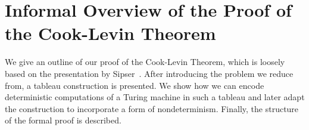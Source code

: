 \newcommand*{\gennp}{\normalfont\textbf{TMGenNP}}

\newcommand{\strent}{\rightsquigarrow}
\newcommand{\Rfinal}{R_{\text{final}}}


\newcommand{\BPR}{\normalfont\textbf{BinaryPR}}
\newcommand{\fsat}{\normalfont\textbf{FSAT}}
\newcommand{\sat}{\normalfont\textbf{SAT}}

\newcommand{\trewwin}[6]{%
  \tikzexternaldisable{}
  \begin{tikzpicture}[baseline={([yshift=-22pt]current bounding box.north)}]
    \draw[thick] (0, 0) -- (2.25, 0);
    \draw (0.75, -0.75) -- (0.75, 0.75);
    \draw (1.5, -0.75) -- (1.5, 0.75);
    \node at (0.375, 0.375) {\ensuremath{#1}};
    \node at (0.375, -0.375) {\ensuremath{#4}};
    \node at (1.125, 0.375) {\ensuremath{#2}};
    \node at (1.125, -0.375) {\ensuremath{#5}};
    \node at (1.875, 0.375) {\ensuremath{#3}};
    \node at (1.875, -0.375) {\ensuremath{#6}};
  \end{tikzpicture}
  \tikzexternalenable{}
}

\newcommand*{\irewwin}[6]{\ensuremath{[#1, #2, #3]~/~[#4, #5, #6]}}

\newcommand{\blank}{\textbf{\normalfont\textvisiblespace}}
\newcommand{\delim}{\#}

\newcommand{\polarity}{\textsf{polarity}}


\newcommand*{\TallestContent}{\ensuremath{b \sigma_1 \blank}}%

\newcommand{\polneg}[1]{\overleftarrow{#1\vphantom{\TallestContent}}}
\newcommand{\polpos}[1]{\overrightarrow{#1\vphantom{\TallestContent}}}
\newcommand{\polneut}[1]{\overline{#1\vphantom{\TallestContent}}}

\newcommand{\reprt}[1]{\ensuremath{\sim_t^{#1}}}
\newcommand{\reprtt}[2]{\ensuremath{\sim_t^{(#1, #2)}}}
\newcommand{\reprc}{\ensuremath{\sim_c}}



\chapter{Informal Overview of the Proof of the Cook-Levin Theorem}\label{chap:informaloverview}
We give an outline of our proof of the Cook-Levin Theorem, which is loosely based on the presentation by Sipser~\cite{Sipser:TheoryofComputation}. After introducing the problem we reduce from, a tableau construction is presented. We show how we can encode deterministic computations of a Turing machine in such a tableau and later adapt the construction to incorporate a form of nondeterminism. Finally, the structure of the formal proof is described. 

